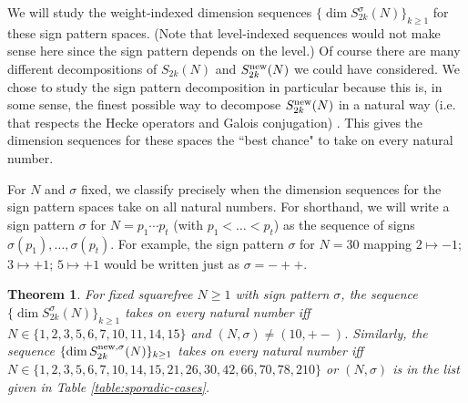 \documentclass[12pt,letterpaper,reqno]{amsart}
\newtheorem{theorem}{Theorem}[section]
\theoremstyle{definition}
\numberwithin{equation}{section}
\numberwithin{figure}{section}
\numberwithin{table}{section}
\newcommand{\nw}{{\textnormal{new}}}
\begin{document}

We will study the weight-indexed dimension sequences $\{ \dim S_{2k}^\sigma(N) \}_{k\ge1}$ for these sign pattern spaces. (Note that level-indexed sequences would not make sense here since the sign pattern depends on the level.) 
Of course there are many different decompositions of $S_{2k}(N)$ and $S_{2k}^\nw(N)$ we could have considered. We chose to study the sign pattern decomposition in particular because this is, in some sense, the finest possible way to decompose $S_{2k}^\nw(N)$ in a natural way (i.e. that respects the Hecke operators and Galois conjugation) \cite[Section 5]{chow-ghitza}. This gives the dimension sequences for these spaces the ``best chance" to take on every natural number. 

For $N$ and $\sigma$ fixed, we classify precisely when the dimension sequences for the sign pattern spaces take on all natural numbers. For shorthand, we will write a sign pattern $\sigma$ for $N = p_1 \cdots p_t$ (with $p_1 < \ldots < p_t$) as the sequence of signs $\sigma(p_1), \ldots, \sigma(p_t)$. For example, the sign pattern $\sigma$ for $N=30$ mapping $2 \mapsto -1$; $3 \mapsto +1$; $5 \mapsto +1$ would be written just as $\sigma = -++$.
\begin{theorem} \label{thm:k-indexed-sgnpatt}
    For fixed squarefree $N \ge 1$ with sign pattern $\sigma$, the sequence $\{ \dim S_{2k}^\sigma(N) \}_{k\ge1}$ 
    takes on every natural number iff $N \in \{1,2,3,5,6,7,10,11,14,15\}$ and $(N,\sigma) \ne (10,+-)$. 
    Similarly, the sequence $\{ \dim S_{2k}^{\nw,\sigma}(N) \}_{k\ge1}$ takes on every natural number iff 
$N \in \{
1,\allowbreak 2,\allowbreak 3,\allowbreak 5,\allowbreak 6,\allowbreak 7,\allowbreak 10,\allowbreak 14,\allowbreak 15,\allowbreak 21,\allowbreak 26,\allowbreak 30,\allowbreak 42,\allowbreak 66,\allowbreak 70,\allowbreak 78,\allowbreak 210
\}$ or 
$(N,\sigma)$ is in the list given in Table \ref{table:sporadic-cases}. 
\end{theorem}
\end{document}
